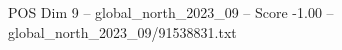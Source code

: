 \begin{textsample}{POS Dim 9 – global\_north\_2023\_09 – Score -1.00 – global\_north\_2023\_09/91538831.txt}
\end{textsample}

